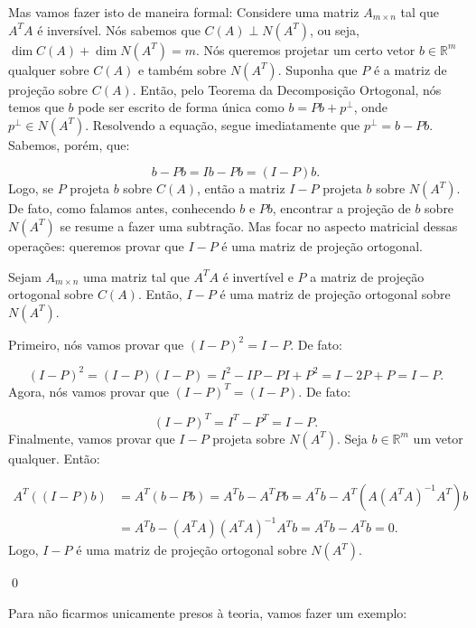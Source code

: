 Mas vamos fazer isto de maneira formal: Considere uma matriz $A_{m\times n}$ tal que $A^TA$ é inversível. Nós sabemos que $C(A)\perp N(A^T)$, ou seja, $\dim C(A) + \dim N(A^T) = m$. Nós queremos projetar um certo vetor $b\in\mathbb{R}^m$ qualquer sobre $C(A)$ e também sobre $N(A^T)$. Suponha que $P$ é a matriz de projeção sobre $C(A)$. Então, pelo Teorema da Decomposição Ortogonal, nós temos que $b$ pode ser escrito de forma única como $b = Pb + p^\perp$, onde $p^\perp\in N(A^T)$. Resolvendo a equação, segue imediatamente que $p^\perp = b - Pb$. Sabemos, porém, que:

$$
b - Pb = Ib - Pb = (I - P)b.
$$
Logo, se $P$ projeta $b$ sobre $C(A)$, então a matriz $I - P$ projeta $b$ sobre $N(A^T)$. De fato, como falamos antes, conhecendo $b$ e $Pb$, encontrar a projeção de $b$ sobre $N(A^T)$ se resume a fazer uma subtração. Mas focar no aspecto matricial dessas operações: queremos provar que $I - P$ é uma matriz de projeção ortogonal.

\begin{Proposition}
	Sejam $A_{m\times n}$ uma matriz tal que $A^TA$ é invertível e $P$ a matriz de projeção ortogonal sobre $C(A)$. Então, $I - P$ é uma matriz de projeção ortogonal sobre $N(A^T)$.
\end{Proposition}

\begin{Proof}
	Primeiro, nós vamos provar que $(I - P)^2 = I - P$. De fato:
	
	$$
	(I - P)^2 = (I - P)(I - P) = I^2 -IP - PI + P^2 = I - 2P + P = I - P.
	$$
	Agora, nós vamos provar que $(I - P)^T = (I - P)$. De fato:
	
	$$
	(I - P)^T = I^T - P^T = I - P.
	$$
	Finalmente, vamos provar que $I - P$ projeta sobre $N(A^T)$. Seja $b\in\mathbb{R}^m$ um vetor qualquer. Então:
	
	\begin{align*}
		A^T((I - P)b) &= A^T(b - Pb) = A^Tb - A^TPb = A^Tb - A^T(A(A^TA)^{-1}A^T)b \\ &= A^Tb - (A^TA)(A^TA)^{-1}A^Tb = A^Tb - A^Tb = 0.
	\end{align*}
	Logo, $I - P$ é uma matriz de projeção ortogonal sobre $N(A^T)$.
	
	\qed
\end{Proof}

Para não ficarmos unicamente presos à teoria, vamos fazer um exemplo:

